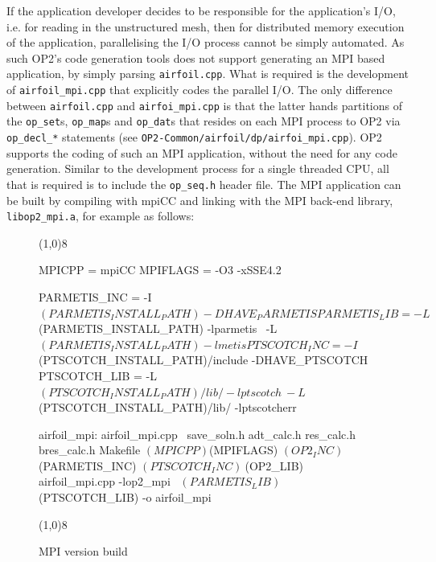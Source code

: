 \documentclass[11pt]{article}
\begin{document}
If the application developer decides to be responsible for the application's I/O, i.e. for reading in the unstructured
mesh, then for distributed memory execution of the application, parallelising the I/O process cannot be simply
automated. As such OP2's code generation tools does not support generating an MPI based application, by simply parsing
\texttt{airfoil.cpp}. What is required is the development of \texttt{airfoil\_mpi.cpp} that explicitly codes the
parallel I/O. The only difference between \texttt{airfoil.cpp} and \texttt{airfoi\_mpi.cpp} is that the latter hands
partitions of the \texttt{op\_set}s, \texttt{op\_map}s and \texttt{op\_dat}s that resides on each MPI process to OP2 via
\texttt{op\_decl\_*} statements (see \texttt{OP2-Common/airfoil/dp/airfoi\_mpi.cpp}). OP2 supports the coding of such an
MPI application, without the need for any code generation. Similar to the development process for a single threaded CPU,
all that is required is to include the \texttt{op\_seq.h} header file. The MPI application can be built by compiling
with mpiCC and linking with the MPI back-end library, \texttt{libop2\_mpi.a}, for example as follows:

\begin{figure}[!h]\small
\vspace{-0pt}\noindent\line(1,0){8}\vspace{-20pt}
\begin{pyglist}[language=make]
MPICPP          = mpiCC
MPIFLAGS        = -O3 -xSSE4.2 

PARMETIS_INC    = -I$(PARMETIS_INSTALL_PATH) -DHAVE_PARMETIS
PARMETIS_LIB    = -L$(PARMETIS_INSTALL_PATH) -lparmetis \
                  -L$(PARMETIS_INSTALL_PATH) -lmetis

PTSCOTCH_INC    = -I$(PTSCOTCH_INSTALL_PATH)/include -DHAVE_PTSCOTCH
PTSCOTCH_LIB    = -L$(PTSCOTCH_INSTALL_PATH)/lib/ -lptscotch \
                  -L$(PTSCOTCH_INSTALL_PATH)/lib/ -lptscotcherr

airfoil_mpi: airfoil_mpi.cpp \
        save_soln.h adt_calc.h res_calc.h bres_calc.h Makefile
        $(MPICPP) $(MPIFLAGS) $(OP2_INC) \
        $(PARMETIS_INC) $(PTSCOTCH_INC) \
        $(OP2_LIB) airfoil_mpi.cpp -lop2_mpi \
        $(PARMETIS_LIB) $(PTSCOTCH_LIB) -o airfoil_mpi
\end{pyglist}
\vspace{-10pt}\noindent\line(1,0){8}\vspace{-10pt}
\caption{\small MPI version build }
\normalsize\vspace{-0pt}\label{fig:mpibuild}
\end{figure}
\end{document}
